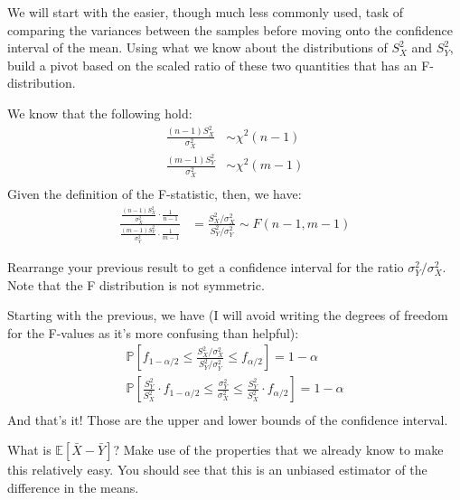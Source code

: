
We will start with the easier, though much less commonly used, task of
comparing the variances between the samples before moving onto the confidence
interval of the mean. Using what we know about the distributions of $S_X^2$ and
$S_Y^2$, build a pivot based on the scaled ratio of these two quantities that
has an F-distribution.


We know that the following hold:
\begin{align*}
\frac{(n-1) S_X^2}{\sigma_X^2} &\sim \chi^2(n-1) \\
\frac{(m-1) S_Y^2}{\sigma_X^2} &\sim \chi^2(m-1) \\
\end{align*}
Given the definition of the F-statistic, then, we have:
\begin{align*}
\frac{
  \frac{(n-1) S_X^2}{\sigma_X^2} \cdot \frac{1}{n-1}
}{
  \frac{(m-1) S_Y^2}{\sigma_Y^2} \cdot \frac{1}{m-1}  
} &= \frac{
  S_X^2 / \sigma_X^2
}{
  S_Y^2 / \sigma_Y^2
} \sim F(n-1, m-1)
\end{align*}


Rearrange your previous result to get a confidence interval for the ratio
$\sigma_Y^2 / \sigma_X^2$. Note that the F distribution is not symmetric.


Starting with the previous, we have (I will avoid writing the degrees of
freedom for the F-values as it's more confusing than helpful):
\begin{align*}
\mathbb{P}\left[ f_{1-\alpha/2} \leq \frac{
  S_X^2 / \sigma_X^2
}{
  S_Y^2 / \sigma_Y^2
} \leq f_{\alpha/2} \right] = 1 - \alpha \\
\mathbb{P}\left[
  \frac{S_Y^2}{S_X^2} \cdot f_{1-\alpha/2} \leq 
\frac{\sigma_Y^2}{\sigma_X^2} \leq
\frac{S_Y^2}{S_X^2} \cdot f_{\alpha/2} \right] = 1- \alpha \\
\end{align*}
And that's it! Those are the upper and lower bounds of the confidence interval.


What is $\mathbb{E}[\bar{X} - \bar{Y}]$? Make use of the properties that we
already know to make this relatively easy. You should see that this is an
unbiased estimator of the difference in the means.

